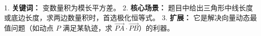 \begin{summarybox}
1. \textbf{关键词：} 变数量积为模长平方差。
2. \textbf{核心场景：} 题目中给出三角形中线长度或底边长度，求两边数量积时，首选极化恒等式。
3. \textbf{扩展：} 它是解决向量动态最值问题（如动点 $P$ 满足某轨迹，求 $\vec{PA} \cdot \vec{PB}$）的利器。
\end{summarybox}
